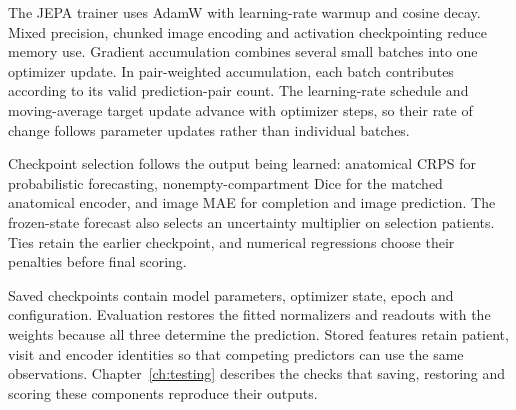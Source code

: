 The JEPA trainer uses AdamW with learning-rate warmup and cosine decay. Mixed precision, chunked image encoding and activation checkpointing reduce memory use. Gradient accumulation combines several small batches into one optimizer update. In pair-weighted accumulation, each batch contributes according to its valid prediction-pair count. The learning-rate schedule and moving-average target update advance with optimizer steps, so their rate of change follows parameter updates rather than individual batches.

Checkpoint selection follows the output being learned: anatomical CRPS for probabilistic forecasting, nonempty-compartment Dice for the matched anatomical encoder, and image MAE for completion and image prediction. The frozen-state forecast also selects an uncertainty multiplier on selection patients. Ties retain the earlier checkpoint, and numerical regressions choose their penalties before final scoring.

Saved checkpoints contain model parameters, optimizer state, epoch and configuration. Evaluation restores the fitted normalizers and readouts with the weights because all three determine the prediction. Stored features retain patient, visit and encoder identities so that competing predictors can use the same observations. Chapter~\ref{ch:testing} describes the checks that saving, restoring and scoring these components reproduce their outputs.

\endgroup
